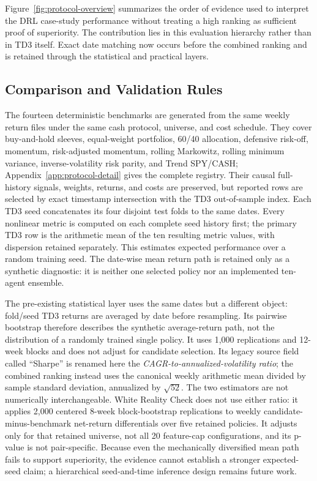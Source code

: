 \documentclass[11pt]{article}
\begin{document}
Figure~\ref{fig:protocol-overview} summarizes the order of evidence used to interpret the DRL case-study performance without treating a high ranking as sufficient proof of superiority. The contribution lies in this evaluation hierarchy rather than in TD3 itself. Exact date matching now occurs before the combined ranking and is retained through the statistical and practical layers.

\subsection{Comparison and Validation Rules}

The fourteen deterministic benchmarks are generated from the same weekly return files under the same cash protocol, universe, and cost schedule. They cover buy-and-hold sleeves, equal-weight portfolios, 60/40 allocation, defensive risk-off, momentum, risk-adjusted momentum, rolling Markowitz, rolling minimum variance, inverse-volatility risk parity, and Trend SPY/CASH; Appendix~\ref{app:protocol-detail} gives the complete registry. Their causal full-history signals, weights, returns, and costs are preserved, but reported rows are selected by exact timestamp intersection with the TD3 out-of-sample index. Each TD3 seed concatenates its four disjoint test folds to the same \AlignedWeeks{} dates. Every nonlinear metric is computed on each complete seed history first; the primary TD3 row is the arithmetic mean of the ten resulting metric values, with dispersion retained separately. This estimates expected performance over a random training seed. The date-wise mean return path is retained only as a synthetic diagnostic: it is neither one selected policy nor an implemented ten-agent ensemble.

The pre-existing statistical layer uses the same \AlignedWeeks{} dates but a different object: fold/seed TD3 returns are averaged by date before resampling. Its pairwise bootstrap therefore describes the synthetic average-return path, not the distribution of a randomly trained single policy. It uses 1,000 replications and 12-week blocks and does not adjust for candidate selection. Its legacy source field called ``Sharpe'' is renamed here the \emph{CAGR-to-annualized-volatility ratio}; the combined ranking instead uses the canonical weekly arithmetic mean divided by sample standard deviation, annualized by $\sqrt{52}$. The two estimators are not numerically interchangeable. White Reality Check does not use either ratio: it applies 2,000 centered 8-week block-bootstrap replications to weekly candidate-minus-benchmark net-return differentials over five retained policies. It adjusts only for that retained universe, not all 20 feature-cap configurations, and its p-value is not pair-specific. Because even the mechanically diversified mean path fails to support superiority, the evidence cannot establish a stronger expected-seed claim; a hierarchical seed-and-time inference design remains future work.
\end{document}
